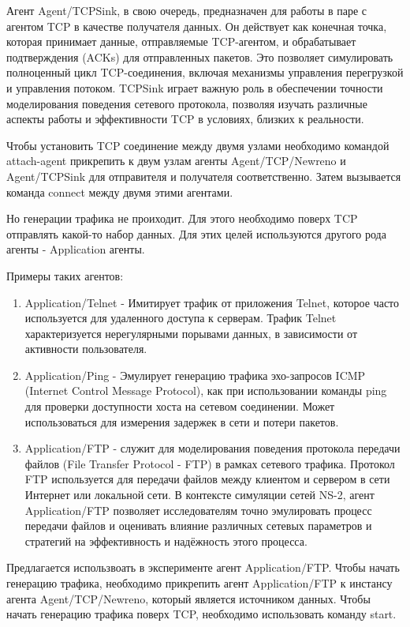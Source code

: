 Агент Agent/TCPSink, в свою очередь, предназначен для работы в паре с агентом TCP в качестве получателя данных. Он действует как конечная точка, которая принимает данные, отправляемые TCP-агентом, и обрабатывает подтверждения (ACKs) для отправленных пакетов. Это позволяет симулировать полноценный цикл TCP-соединения, включая механизмы управления перегрузкой и управления потоком. TCPSink играет важную роль в обеспечении точности моделирования поведения сетевого протокола, позволяя изучать различные аспекты работы и эффективности TCP в условиях, близких к реальности.

Чтобы установить TCP соединение между двумя узлами необходимо командой attach-agent прикрепить к двум узлам агенты Agent/TCP/Newreno и Agent/TCPSink для отправителя и получателя соответственно. Затем вызывается команда connect между двумя этими агентами.

Но генерации трафика не проиходит. Для этого необходимо поверх TCP отправлять какой-то набор данных. Для этих целей используются другого рода агенты - Application агенты.

Примеры таких агентов:

\begin{enumerate}
  \item Application/Telnet - Имитирует трафик от приложения Telnet, которое часто используется для удаленного доступа к серверам. Трафик Telnet характеризуется нерегулярными порывами данных, в зависимости от активности пользователя.
  \item Application/Ping - Эмулирует генерацию трафика эхо-запросов ICMP (Internet Control Message Protocol), как при использовании команды ping для проверки доступности хоста на сетевом соединении. Может использоваться для измерения задержек в сети и потери пакетов.
  \item Application/FTP - служит для моделирования поведения протокола передачи файлов (File Transfer Protocol - FTP) в рамках сетевого трафика. Протокол FTP используется для передачи файлов между клиентом и сервером в сети Интернет или локальной сети. В контексте симуляции сетей NS-2, агент Application/FTP позволяет исследователям точно эмулировать процесс передачи файлов и оценивать влияние различных сетевых параметров и стратегий на эффективность и надёжность этого процесса.
\end{enumerate}

Предлагается использвоать в эксперименте агент Application/FTP. Чтобы начать генерацию трафика, необходимо прикрепить агент Application/FTP к инстансу агента Agent/TCP/Newreno, который является источником данных. Чтобы начать генерацию трафика поверх TCP, необходимо использовать команду start.

